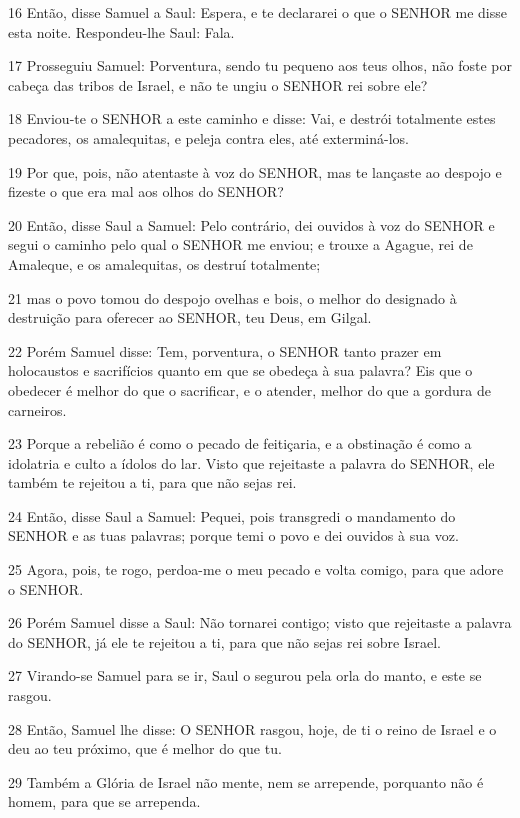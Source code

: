\par 16 Então, disse Samuel a Saul: Espera, e te declararei o que o SENHOR me disse esta noite. Respondeu-lhe Saul: Fala.
\par 17 Prosseguiu Samuel: Porventura, sendo tu pequeno aos teus olhos, não foste por cabeça das tribos de Israel, e não te ungiu o SENHOR rei sobre ele?
\par 18 Enviou-te o SENHOR a este caminho e disse: Vai, e destrói totalmente estes pecadores, os amalequitas, e peleja contra eles, até exterminá-los.
\par 19 Por que, pois, não atentaste à voz do SENHOR, mas te lançaste ao despojo e fizeste o que era mal aos olhos do SENHOR?
\par 20 Então, disse Saul a Samuel: Pelo contrário, dei ouvidos à voz do SENHOR e segui o caminho pelo qual o SENHOR me enviou; e trouxe a Agague, rei de Amaleque, e os amalequitas, os destruí totalmente;
\par 21 mas o povo tomou do despojo ovelhas e bois, o melhor do designado à destruição para oferecer ao SENHOR, teu Deus, em Gilgal.
\par 22 Porém Samuel disse: Tem, porventura, o SENHOR tanto prazer em holocaustos e sacrifícios quanto em que se obedeça à sua palavra? Eis que o obedecer é melhor do que o sacrificar, e o atender, melhor do que a gordura de carneiros.
\par 23 Porque a rebelião é como o pecado de feitiçaria, e a obstinação é como a idolatria e culto a ídolos do lar. Visto que rejeitaste a palavra do SENHOR, ele também te rejeitou a ti, para que não sejas rei.
\par 24 Então, disse Saul a Samuel: Pequei, pois transgredi o mandamento do SENHOR e as tuas palavras; porque temi o povo e dei ouvidos à sua voz.
\par 25 Agora, pois, te rogo, perdoa-me o meu pecado e volta comigo, para que adore o SENHOR.
\par 26 Porém Samuel disse a Saul: Não tornarei contigo; visto que rejeitaste a palavra do SENHOR, já ele te rejeitou a ti, para que não sejas rei sobre Israel.
\par 27 Virando-se Samuel para se ir, Saul o segurou pela orla do manto, e este se rasgou.
\par 28 Então, Samuel lhe disse: O SENHOR rasgou, hoje, de ti o reino de Israel e o deu ao teu próximo, que é melhor do que tu.
\par 29 Também a Glória de Israel não mente, nem se arrepende, porquanto não é homem, para que se arrependa.
